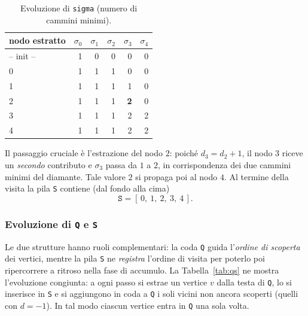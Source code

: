 \documentclass[11pt,a4paper]{report}
\begin{document}
\begin{table}[H]
	\centering
	\caption{Evoluzione di \texttt{sigma} (numero di cammini minimi).}
	\begin{tabular}{l rrrrr}
		\toprule
		nodo estratto & $\sigma_0$ & $\sigma_1$ & $\sigma_2$ & $\sigma_3$ & $\sigma_4$ \\
		\midrule
		-- init --    & 1          & 0          & 0          & 0          & 0          \\
		0             & 1          & 1          & 1          & 0          & 0          \\
		1             & 1          & 1          & 1          & 1          & 0          \\
		2             & 1          & 1          & 1          & \textbf{2} & 0          \\
		3             & 1          & 1          & 1          & 2          & 2          \\
		4             & 1          & 1          & 1          & 2          & 2          \\
		\bottomrule
	\end{tabular}
\end{table}

Il passaggio cruciale è l'estrazione del nodo $2$: poiché $d_3 = d_2+1$, il nodo
$3$ riceve un \emph{secondo} contributo e $\sigma_3$ passa da $1$ a $2$, in
corrispondenza dei due cammini minimi del diamante. Tale valore $2$ si propaga
poi al nodo $4$. Al termine della visita la pila \texttt{S} contiene (dal fondo
alla cima)
\[
	\texttt{S} = [\,0,\ 1,\ 2,\ 3,\ 4\,].
\]

\subsubsection*{Evoluzione di \texttt{Q} e \texttt{S}}

Le due strutture hanno ruoli complementari: la coda \texttt{Q} guida l'\emph{ordine
di scoperta} dei vertici, mentre la pila \texttt{S} ne \emph{registra} l'ordine di
visita per poterlo poi ripercorrere a ritroso nella fase di accumulo. La
Tabella~\ref{tab:qs} ne mostra l'evoluzione congiunta: a ogni passo si estrae un
vertice $v$ dalla testa di \texttt{Q}, lo si inserisce in \texttt{S} e si
aggiungono in coda a \texttt{Q} i soli vicini non ancora scoperti (quelli con
$d=-1$). In tal modo ciascun vertice entra in \texttt{Q} una sola volta.
\end{document}
